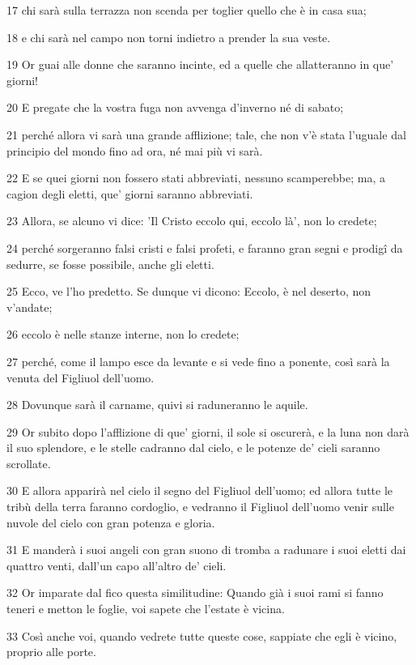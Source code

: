 \par 17 chi sarà sulla terrazza non scenda per toglier quello che è in casa sua;
\par 18 e chi sarà nel campo non torni indietro a prender la sua veste.
\par 19 Or guai alle donne che saranno incinte, ed a quelle che allatteranno in que' giorni!
\par 20 E pregate che la vostra fuga non avvenga d'inverno né di sabato;
\par 21 perché allora vi sarà una grande afflizione; tale, che non v'è stata l'uguale dal principio del mondo fino ad ora, né mai più vi sarà.
\par 22 E se quei giorni non fossero stati abbreviati, nessuno scamperebbe; ma, a cagion degli eletti, que' giorni saranno abbreviati.
\par 23 Allora, se alcuno vi dice: 'Il Cristo eccolo qui, eccolo là', non lo credete;
\par 24 perché sorgeranno falsi cristi e falsi profeti, e faranno gran segni e prodigî da sedurre, se fosse possibile, anche gli eletti.
\par 25 Ecco, ve l'ho predetto. Se dunque vi dicono: Eccolo, è nel deserto, non v'andate;
\par 26 eccolo è nelle stanze interne, non lo credete;
\par 27 perché, come il lampo esce da levante e si vede fino a ponente, così sarà la venuta del Figliuol dell'uomo.
\par 28 Dovunque sarà il carname, quivi si raduneranno le aquile.
\par 29 Or subito dopo l'afflizione di que' giorni, il sole si oscurerà, e la luna non darà il suo splendore, e le stelle cadranno dal cielo, e le potenze de' cieli saranno scrollate.
\par 30 E allora apparirà nel cielo il segno del Figliuol dell'uomo; ed allora tutte le tribù della terra faranno cordoglio, e vedranno il Figliuol dell'uomo venir sulle nuvole del cielo con gran potenza e gloria.
\par 31 E manderà i suoi angeli con gran suono di tromba a radunare i suoi eletti dai quattro venti, dall'un capo all'altro de' cieli.
\par 32 Or imparate dal fico questa similitudine: Quando già i suoi rami si fanno teneri e metton le foglie, voi sapete che l'estate è vicina.
\par 33 Così anche voi, quando vedrete tutte queste cose, sappiate che egli è vicino, proprio alle porte.
